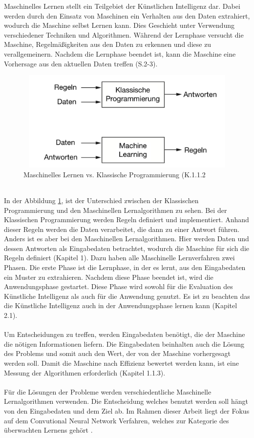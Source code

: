 \documentclass[12pt]{scrreprt}
\begin{document}
Maschinelles Lernen stellt ein Teilgebiet der Künstlichen Intelligenz dar. Dabei werden durch den Einsatz von Maschinen ein Verhalten aus den Daten extrahiert, wodurch die Maschine selbst Lernen kann. Dies Geschieht unter Verwendung verschiedener Techniken und Algorithmen. Während der Lernphase versucht die Maschine, Regelmäßigkeiten aus den Daten zu erkennen und diese zu verallgemeinern. Nachdem die Lernphase beendet ist, kann die Maschine eine Vorhersage aus den aktuellen Daten treffen \cite{Frochte2021}(S.2-3).\\
\begin{figure}[h!]
	\centering
	\includegraphics[width=12cm, height=5cm]{Abbildung_MaschinellesLernen_1.jpg}
	\caption{Maschinelles Lernen vs. Klassische Programmierung \cite{Chollet2018}(K.1.1.2}
	\label{fig:fig1}
\end{figure}
\\
In der Abbildung \ref{fig:fig1}, ist der Unterschied zwischen der Klassischen Programmierung und den Maschinellen Lernalgorithmen zu sehen. Bei der Klassischen Programmierung werden Regeln definiert und implementiert. Anhand dieser Regeln werden die Daten verarbeitet, die dann zu einer Antwort führen. Anders ist es aber bei den Maschinellen Lernalgorithmen. Hier werden Daten und dessen Antworten als Eingabedaten betrachtet, wodurch die Maschine für sich die Regeln definiert \cite{Chollet2018}(Kapitel 1). Dazu haben alle Maschinelle Lernverfahren zwei Phasen. Die erste Phase ist die Lernphase, in der es lernt, aus den Eingabedaten ein Muster zu extrahieren. Nachdem diese Phase beendet ist, wird die Anwendungsphase gestartet. Diese Phase wird sowohl für die Evaluation des Künstliche Intelligenz als auch für die Anwendung genutzt. Es ist zu beachten das die Künstliche Intelligenz auch in der Anwendungsphase lernen kann  \cite{Chollet2018}(Kapitel 2.1). 
	\\
	\\
Um Entscheidungen zu treffen, werden Eingabedaten benötigt, die der Maschine die nötigen Informationen liefern. Die Eingabedaten beinhalten auch die Lösung des Problems und somit auch den Wert, der von der Maschine vorhergesagt werden soll. Damit die Maschine nach Effizienz bewertet werden kann, ist eine Messung der Algorithmen erforderlich \cite{Chollet2018}(Kapitel 1.1.3).
	\\
	\\
Für die Lösungen der Probleme werden verschiedentliche Maschinelle Lernalgorithmen verwenden. Die Entscheidung welches benutzt werden soll hängt von den Eingabedaten und dem Ziel ab. Im Rahmen dieser Arbeit liegt der Fokus auf dem Convutional Neural Network Verfahren, welches zur Kategorie des überwachten Lernens gehört \cite{Luber2019}.
	
\end{document}
